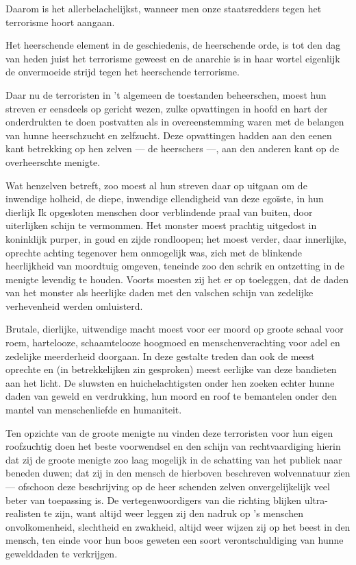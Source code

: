 \documentclass[a4paper, 12pt, oneside, dutch]{article}
\begin{document}
Daarom is het allerbelachelijkst, wanneer men onze staatsredders tegen het terrorisme hoort aangaan.

Het heerschende element in de geschiedenis, de heerschende orde, is tot den dag van heden juist het terrorisme geweest en de anarchie is in haar wortel eigenlijk de onvermoeide strijd tegen het heerschende terrorisme.

Daar nu de terroristen in 't algemeen de toestanden beheerschen, moest hun streven er eensdeels op gericht wezen, zulke opvattingen in hoofd en hart der onderdrukten te doen postvatten als in overeenstemming waren met de belangen van hunne heerschzucht en zelfzucht. Deze opvattingen hadden aan den eenen kant betrekking op hen zelven --- de heerschers ---, aan den anderen kant op de overheerschte menigte.

Wat henzelven betreft, zoo moest al hun streven daar op uitgaan om de inwendige holheid, de diepe, inwendige ellendigheid van deze egoïste, in hun dierlijk Ik opgesloten menschen door verblindende praal van buiten, door uiterlijken schijn te vermommen. Het monster moest prachtig uitgedost in koninklijk purper, in goud en zijde rondloopen; het moest verder, daar innerlijke, oprechte achting tegenover hem onmogelijk was, zich met de blinkende heerlijkheid van moordtuig omgeven, teneinde zoo den schrik en ontzetting in de menigte levendig te houden. Voorts moesten zij het er op toeleggen, dat de daden van het monster als heerlijke daden met den valschen schijn van zedelijke verhevenheid werden omluisterd.

Brutale, dierlijke, uitwendige macht moest voor eer moord op groote schaal voor roem, hartelooze, schaamtelooze hoogmoed en menschenverachting voor adel en zedelijke meerderheid doorgaan. In deze gestalte treden dan ook de meest oprechte en (in betrekkelijken zin gesproken) meest eerlijke van deze bandieten aan het licht. De sluwsten en huichelachtigsten onder hen zoeken echter hunne daden van geweld en verdrukking, hun moord en roof te bemantelen onder den mantel van menschenliefde en humaniteit.

Ten opzichte van de groote menigte nu vinden deze terroristen voor hun eigen roofzuchtig doen het beste voorwendsel en den schijn van rechtvaardiging hierin dat zij de groote menigte zoo laag mogelijk in de schatting van het publiek naar beneden duwen; dat zij in den mensch de hierboven beschreven wolvennatuur zien --- ofschoon deze beschrijving op de heer schenden zelven onvergelijkelijk veel beter van toepassing is. De vertegenwoordigers van die richting blijken ultra-realisten te zijn, want altijd weer leggen zij den nadruk op 's menschen onvolkomenheid, slechtheid en zwakheid, altijd weer wijzen zij op het beest in den mensch, ten einde voor hun boos geweten een soort verontschuldiging van hunne gewelddaden te verkrijgen.
\end{document}
